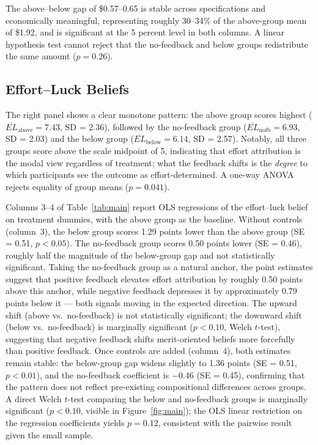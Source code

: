 \documentclass[12pt]{article}
\begin{document}
The above--below gap of \$0.57--0.65 is stable across specifications and
economically meaningful, representing roughly 30--34\% of the above-group
mean of \$1.92, and is significant at the 5 percent level in both columns.
A linear hypothesis test cannot reject that the no-feedback and below groups
redistribute the same amount ($p = 0.26$).

\subsection{Effort--Luck Beliefs}
\label{sec:beliefs}

The right panel shows a clear monotone pattern: the above group scores highest
($\overline{EL}_{\text{above}} = 7.43$, SD = 2.36), followed by the
no-feedback group ($\overline{EL}_{\text{nofb}} = 6.93$, SD = 2.03) and
the below group ($\overline{EL}_{\text{below}} = 6.14$, SD = 2.57).
Notably, all three groups score above the scale midpoint of 5, indicating
that effort attribution is the modal view regardless of treatment; what
the feedback shifts is the \emph{degree} to which participants see the
outcome as effort-determined.
A one-way ANOVA rejects equality of group means ($p = 0.041$).

Columns 3--4 of Table~\ref{tab:main} report OLS regressions of the
effort--luck belief on treatment dummies, with the above group as the
baseline.
Without controls (column~3), the below group scores 1.29 points lower than
the above group (SE = 0.51, $p < 0.05$).
The no-feedback group scores 0.50 points lower (SE = 0.46),
roughly half the magnitude of the below-group gap and not statistically
significant.
Taking the no-feedback group as a natural anchor, the point estimates suggest
that positive feedback elevates effort attribution by roughly 0.50 points
above this anchor, while negative feedback depresses it by approximately
0.79 points below it --- both signals moving in the expected direction.
The upward shift (above vs.\ no-feedback) is not statistically significant;
the downward shift (below vs.\ no-feedback) is marginally significant
($p < 0.10$, Welch $t$-test), suggesting that negative feedback shifts
merit-oriented beliefs more forcefully than positive feedback.
Once controls are added (column~4), both estimates remain stable: the
below-group gap widens slightly to 1.36 points (SE = 0.51, $p < 0.01$),
and the no-feedback coefficient is $-0.46$ (SE = 0.45), confirming that
the pattern does not reflect pre-existing compositional differences across
groups.
A direct Welch $t$-test comparing the below and no-feedback groups is
marginally significant ($p < 0.10$, visible in Figure~\ref{fig:main});
the OLS linear restriction on the regression coefficients yields $p = 0.12$,
consistent with the pairwise result given the small sample.
\end{document}

